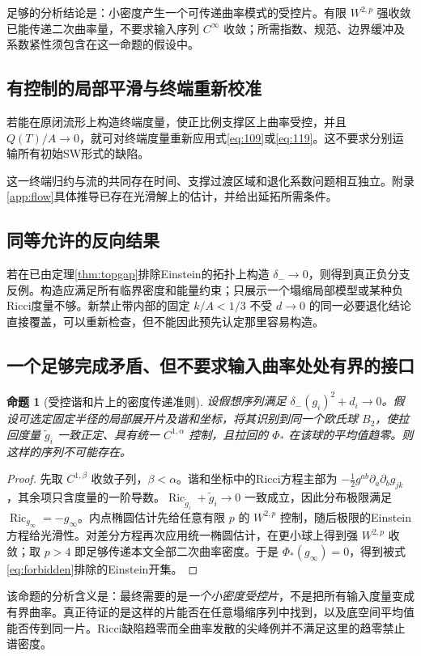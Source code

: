 \documentclass[UTF8,a4paper,11pt,fontset=fandol]{ctexart}
\numberwithin{equation}{section}
\newtheorem{proposition}[theorem]{命题}
\theoremstyle{definition}
\newcommand{\Ric}{\operatorname{Ric}}
\begin{document}
足够的分析结论是：小密度产生一个可传递曲率模式的受控片。有限 $W^{2,p}$ 强收敛已能传递二次曲率量，不要求输入序列 $C^\infty$ 收敛；所需指数、规范、边界缓冲及系数紧性须包含在这一命题的假设中。

\subsection{有控制的局部平滑与终端重新校准}
若能在原闭流形上构造终端度量，使正比例支撑区上曲率受控，并且 $Q(T)/A\to0$，就可对终端度量重新应用式\eqref{eq:109}或\eqref{eq:119}。这不要求分别运输所有初始SW形式的缺陷。

这一终端归约与流的共同存在时间、支撑过渡区域和退化系数问题相互独立。附录\ref{app:flow}具体推导已存在光滑解上的估计，并给出延拓所需条件。

\subsection{同等允许的反向结果}
若在已由定理\ref{thm:topgap}排除Einstein的拓扑上构造 $\delta_-\to0$，则得到真正负分支反例。构造应满足所有临界密度和能量约束；只展示一个塌缩局部模型或某种负Ricci度量不够。新禁止带内部的固定 $k/A<1/3$ 不受 $d\to0$ 的同一必要退化结论直接覆盖，可以重新检查，但不能因此预先认定那里容易构造。


\subsection{一个足够完成矛盾、但不要求输入曲率处处有界的接口}
\begin{proposition}[受控谐和片上的密度传递准则]\label{prop:minimalbridge}
设假想序列满足 $\delta_-(g_i)^2+d_i\to0$。假设可选定固定半径的局部展开片及谐和坐标，将其识别到同一个欧氏球 $B_2$，使拉回度量 $\widetilde g_i$ 一致正定、具有统一 $C^{1,\alpha}$ 控制，且拉回的 $\Phi_*$ 在该球的平均值趋零。则这样的序列不可能存在。
\end{proposition}
\begin{proof}
先取 $C^{1,\beta}$ 收敛子列，$\beta<\alpha$。谐和坐标中的Ricci方程主部为 $-\frac12 g^{ab}\partial_a\partial_b g_{jk}$，其余项只含度量的一阶导数。$\Ric_{\widetilde g_i}+\widetilde g_i\to0$ 一致成立，因此分布极限满足 $\Ric_{g_\infty}=-g_\infty$。内点椭圆估计先给任意有限 $p$ 的 $W^{2,p}$ 控制，随后极限的Einstein方程给光滑性。对差分方程再次应用统一椭圆估计，在更小球上得到强 $W^{2,p}$ 收敛；取 $p>4$ 即足够传递本文全部二次曲率密度。于是 $\Phi_*(g_\infty)=0$，得到被式\eqref{eq:forbidden}排除的Einstein开集。
\end{proof}
该命题的分析含义是：最终需要的是\emph{一个小密度受控片}，不是把所有输入度量变成有界曲率。真正待证的是这样的片能否在任意塌缩序列中找到，以及底空间平均值能否传到同一片。Ricci缺陷趋零而全曲率发散的尖峰例并不满足这里的趋零禁止谱密度。
\end{document}
